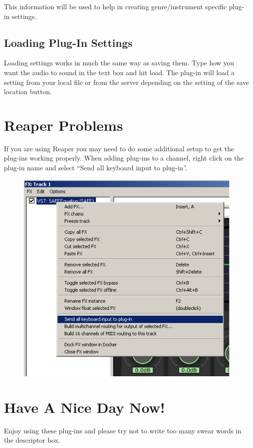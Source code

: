 \documentclass[a4paper]{article}
\begin{document}
		This information will be used to help in creating genre/instrument specific plug-in settings.

	\subsection*{Loading Plug-In Settings}
		Loading settings works in much the same way as saving them. Type how you want the audio to sound in the text box and hit load. The plug-in will load a setting from your local file or from the server depending on the setting of the save location button.

\section*{Reaper Problems}
	If you are using Reaper you may need to do some additional setup to get the plug-ins working properly. When adding plug-ins to a channel, right click on the plug-in name and select ``Send all keyboard input to plug-in''. 

	\begin{figure}[h!]
		\centering
		\includegraphics[scale=1]{Images/Reaper.png}
	\end{figure}

\section*{Have A Nice Day Now!}
	Enjoy using these plug-ins and please try not to write too many swear words in the descriptor box.
\end{document}
